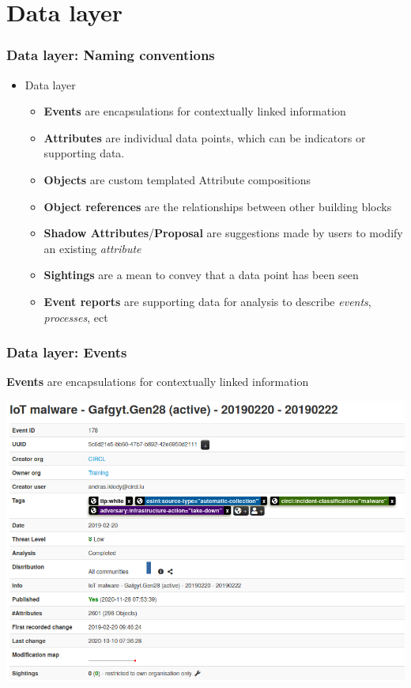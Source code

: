 \section{Data layer}
\begin{frame}
    \frametitle{Data layer: Naming conventions}
     \begin{itemize}
            \item Data layer
            \begin{itemize}
                \item {\bf Events} are encapsulations for contextually linked information
                \item {\bf Attributes} are individual data points, which can be indicators or supporting data.
                \item {\bf Objects} are custom templated Attribute compositions
                \item {\bf Object references} are the relationships between other building blocks
                \item {\bf Shadow Attributes}/{\bf Proposal} are suggestions made by users to modify an existing {\it attribute}
                \item {\bf Sightings} are a mean to convey that a data point has been seen
                \item {\bf Event reports} are supporting data for analysis to describe {\it events}, {\it processes}, ect
            \end{itemize}
    \end{itemize}
\end{frame}

\begin{frame}[fragile]
    \frametitle{Data layer: Events}
        {\bf Events} are encapsulations for contextually linked information
        \begin{center}
            \includegraphics[width=0.9\linewidth]{screenshots/ui-event.png}
        \end{center}
\end{frame}

